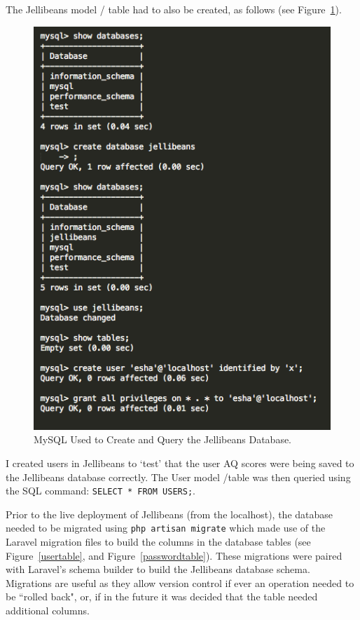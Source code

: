 \documentclass[a4paper, 11pt]{article}
\begin{document}
\vspace{5mm}
The Jellibeans model / table had to also be created, as follows (see Figure~\ref{mysql}). 

\begin{figure}[H]
\begin{center}
\includegraphics[scale=0.5]{mysql}
\caption{MySQL Used to Create and Query the Jellibeans Database.}
\label{mysql}
\end{center}
\end{figure}


I created users in Jellibeans to `test' that the user AQ scores were being saved to the Jellibeans database correctly. The User model /table was then queried using the SQL command: \texttt{SELECT * FROM USERS;}.

\vspace{5mm}
Prior to the live deployment of Jellibeans (from the localhost), the database needed to be migrated using \texttt{php artisan migrate} which made use of the Laravel migration files to build the columns in the database tables (see Figure~\ref{usertable}, and Figure~\ref{passwordtable}). These migrations were paired with Laravel's schema builder to build the Jellibeans database schema. Migrations are useful as they allow version control if ever an operation needed to be ``rolled back", or, if in the future it was decided that the table needed additional columns.
\end{document}
